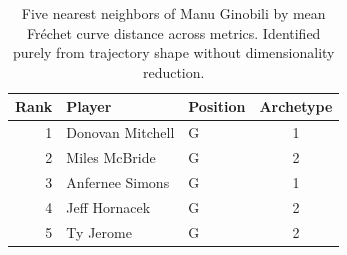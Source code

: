 \begin{table}[htbp]
  \centering\small
  \begin{tabular}{rllc}
    \toprule
    Rank & Player & Position & Archetype \\
    \midrule
    1 & Donovan Mitchell & G & 1 \\
    2 & Miles McBride & G & 2 \\
    3 & Anfernee Simons & G & 1 \\
    4 & Jeff Hornacek & G & 2 \\
    5 & Ty Jerome & G & 2 \\
    \bottomrule
  \end{tabular}
  \caption{Five nearest neighbors of Manu Ginobili by mean Fr\'{e}chet curve distance across metrics. Identified purely from trajectory shape without dimensionality reduction.}
  \label{tab:Manu_Ginobili_frechet_curve_neighbors}
\end{table}

